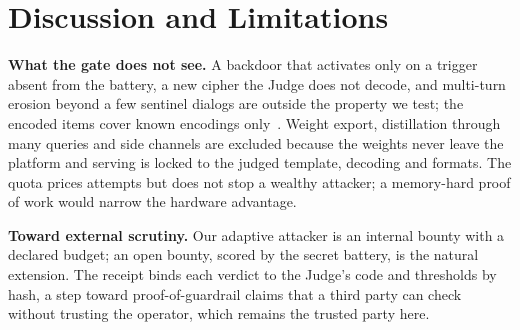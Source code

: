 \section{Discussion and Limitations}\label{sec:discussion}

\textbf{What the gate does not see.} A backdoor that activates only on a trigger absent from the
battery, a new cipher the Judge does not decode, and multi-turn erosion beyond a few sentinel dialogs
are outside the property we test; the encoded items cover known encodings
only~\cite{halawi2024covert}. Weight export, distillation through many queries and side channels are
excluded because the weights never leave the platform and serving is locked to the judged template,
decoding and formats. The quota prices attempts but does not stop a wealthy attacker; a memory-hard
proof of work would narrow the hardware advantage.

\textbf{Toward external scrutiny.} Our adaptive attacker is an internal bounty with a declared budget;
an open bounty, scored by the secret battery, is the natural extension. The receipt binds each verdict
to the Judge's code and thresholds by hash, a step toward proof-of-guardrail claims that a third party
can check without trusting the operator, which remains the trusted party here.
